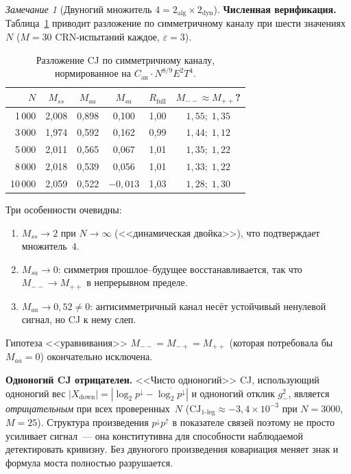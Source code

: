 \documentclass[12pt,a4paper]{article}
\theoremstyle{plain}
\theoremstyle{definition}
\theoremstyle{remark}
\newtheorem{remark}[theorem]{Замечание}
\newcommand{\CJ}{\mathrm{CJ}}
\begin{document}
\begin{remark}[Двуногий множитель $4 = 2_{\mathrm{alg}} \times 2_{\mathrm{dyn}}$]
\medskip\noindent\textbf{Численная верификация.}\enspace
Таблица~\ref{tab:symmetric} приводит разложение по
симметричному каналу при шести значениях~$N$
($M = 30$ CRN-испытаний каждое, $\varepsilon = 3$).
\begin{table}[ht]
\centering
\caption{Разложение CJ по симметричному каналу, нормированное
на $C_{\mathrm{an}} \cdot N^{8/9} E^2 T^4$.}
\label{tab:symmetric}
\begin{tabular}{rccccc}
\toprule
$N$ & $M_{ss}$ & $M_{aa}$ & $M_{sa}$ & $R_{\mathrm{full}}$ & $M_{--} \approx M_{++}$? \\
\midrule
1\,000  & 2,008 & 0,898 & 0,100  & 1,00 & $1{,}55;\; 1{,}35$ \\
3\,000  & 1,974 & 0,592 & 0,162  & 0,99 & $1{,}44;\; 1{,}12$ \\
5\,000  & 2,011 & 0,565 & 0,067  & 1,01 & $1{,}35;\; 1{,}22$ \\
8\,000  & 2,018 & 0,539 & 0,056  & 1,01 & $1{,}33;\; 1{,}22$ \\
10\,000 & 2,059 & 0,522 & $-0{,}013$ & 1,03 & $1{,}28;\; 1{,}30$ \\
\bottomrule
\end{tabular}
\end{table}

Три особенности очевидны:
\begin{enumerate}[label=(\roman*)]
\item $M_{ss} \to 2$ при $N \to \infty$ (<<динамическая двойка>>),
  что подтверждает множитель~$4$.
\item $M_{sa} \to 0$: симметрия прошлое--будущее
  восстанавливается, так что $M_{--} \to M_{++}$ в
  непрерывном пределе.
\item $M_{aa} \to 0{,}52 \neq 0$: антисимметричный канал несёт
  устойчивый ненулевой сигнал, но CJ к нему слеп.
\end{enumerate}
Гипотеза <<уравнивания>> $M_{--} = M_{-+} = M_{++}$
(которая потребовала бы $M_{aa} = 0$) окончательно исключена.

\medskip\noindent\textbf{Одноногий CJ отрицателен.}\enspace
<<Чисто одноногий>> CJ, использующий одноногий вес
$|X_{\mathrm{down}}| = |\log_2 p^{\downarrow}
- \overline{\log_2 p^{\downarrow}}|$ и одноногий отклик
$g_-^2$, является \emph{отрицательным} при всех проверенных~$N$
($\CJ_{\text{1-leg}} \approx -3{,}4 \times 10^{-3}$ при
$N = 3000$, $M = 25$).  Структура произведения
$p^{\downarrow} p^{\uparrow}$ в показателе связей поэтому
не просто усиливает сигнал~--- она конститутивна для
способности наблюдаемой детектировать кривизну.  Без двуногого
произведения ковариация меняет знак и формула моста полностью
разрушается.


\end{remark}
\end{document}
